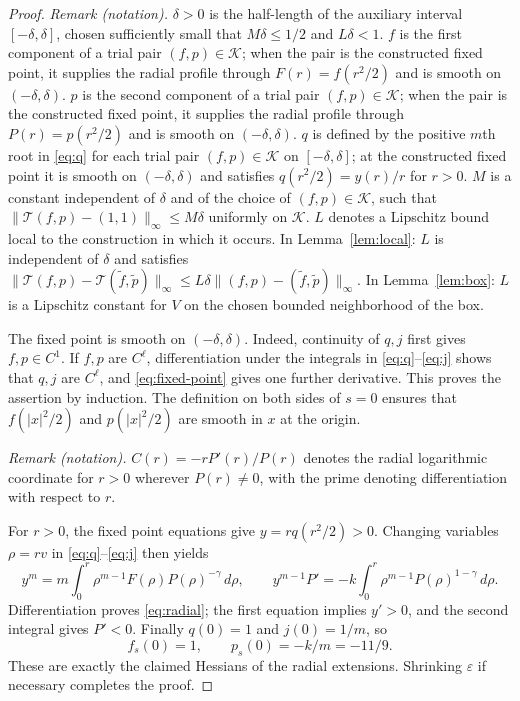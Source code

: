\documentclass[11pt]{article}
\theoremstyle{remark}
\begin{document}
\begin{proof}
\noindent\textit{Remark (notation).} $\delta>0$ is the half-length of the auxiliary interval $[-\delta,\delta]$, chosen sufficiently small that $M\delta\leq1/2$ and $L\delta<1$. $f$ is the first component of a trial pair $(f,p)\in\mathcal K$; when the pair is the constructed fixed point, it supplies the radial profile through $F(r)=f(r^2/2)$ and is smooth on $(-\delta,\delta)$. $p$ is the second component of a trial pair $(f,p)\in\mathcal K$; when the pair is the constructed fixed point, it supplies the radial profile through $P(r)=p(r^2/2)$ and is smooth on $(-\delta,\delta)$. $q$ is defined by the positive $m$th root in \eqref{eq:q} for each trial pair $(f,p)\in\mathcal K$ on $[-\delta,\delta]$; at the constructed fixed point it is smooth on $(-\delta,\delta)$ and satisfies $q(r^2/2)=y(r)/r$ for $r>0$. $M$ is a constant independent of $\delta$ and of the choice of $(f,p)\in\mathcal K$, such that $\|\mathcal T(f,p)-(1,1)\|_\infty\leq M\delta$ uniformly on $\mathcal K$. $L$ denotes a Lipschitz bound local to the construction in which it occurs. In Lemma~\ref{lem:local}: $L$ is independent of $\delta$ and satisfies $\|\mathcal T(f,p)-\mathcal T(\widetilde f,\widetilde p)\|_\infty\leq L\delta\|(f,p)-(\widetilde f,\widetilde p)\|_\infty$. In Lemma~\ref{lem:box}: $L$ is a Lipschitz constant for $V$ on the chosen bounded neighborhood of the box.


The fixed point is smooth on $(-\delta,\delta)$.
Indeed, continuity of $q,j$ first gives $f,p\in C^1$.
If $f,p$ are $C^\ell$, differentiation under the integrals in
\eqref{eq:q}--\eqref{eq:j} shows that $q,j$ are $C^\ell$,
and \eqref{eq:fixed-point} gives one further derivative.
This proves the assertion by induction.  The definition on both
sides of $s=0$ ensures that $f(|x|^2/2)$ and $p(|x|^2/2)$
are smooth in $x$ at the origin.

\noindent\textit{Remark (notation).} $C(r)=-rP'(r)/P(r)$ denotes the radial logarithmic coordinate for $r>0$ wherever $P(r)\ne0$, with the prime denoting differentiation with respect to $r$.


For $r>0$, the fixed point equations give $y=rq(r^2/2)>0$.
Changing variables $\rho=rv$ in \eqref{eq:q}--\eqref{eq:j}
then yields
\begin{equation}\label{eq:integral}
 y^m=m\int_0^r \rho^{m-1}F(\rho)P(\rho)^{-\gamma}\,d\rho,
 \qquad
 y^{m-1}P'=-k\int_0^r\rho^{m-1}P(\rho)^{1-\gamma}\,d\rho.
\end{equation}
Differentiation proves \eqref{eq:radial}; the first equation
implies $y'>0$, and the second integral gives $P'<0$.
Finally $q(0)=1$ and $j(0)=1/m$, so
\[
 f_s(0)=1,\qquad p_s(0)=-k/m=-11/9.
\]
These are exactly the claimed Hessians of the radial extensions.
Shrinking $\varepsilon$ if necessary completes the proof.
\end{proof}
\end{document}
